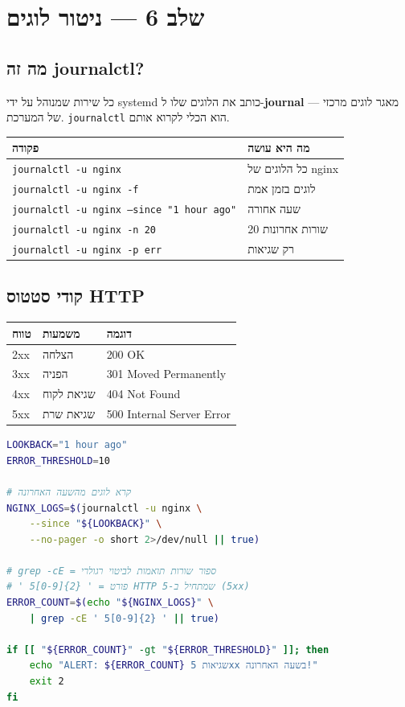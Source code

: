 \documentclass[12pt,a4paper]{article}
\begin{document}
\newpage
\section{שלב 6 — ניטור לוגים}

\subsection{מה זה journalctl?}

כל שירות שמנוהל על ידי systemd כותב את הלוגים שלו ל-\textbf{journal} — מאגר לוגים מרכזי של המערכת. \texttt{journalctl} הוא הכלי לקרוא אותם.

\begin{center}
\begin{tabular}{ll}
\toprule
\textbf{פקודה} & \textbf{מה היא עושה} \\
\midrule
\texttt{journalctl -u nginx} & כל הלוגים של nginx \\
\texttt{journalctl -u nginx -f} & לוגים בזמן אמת \\
\texttt{journalctl -u nginx --since "1 hour ago"} & שעה אחורה \\
\texttt{journalctl -u nginx -n 20} & 20 שורות אחרונות \\
\texttt{journalctl -u nginx -p err} & רק שגיאות \\
\bottomrule
\end{tabular}
\end{center}

\subsection{קודי סטטוס HTTP}

\begin{center}
\begin{tabular}{lll}
\toprule
\textbf{טווח} & \textbf{משמעות} & \textbf{דוגמה} \\
\midrule
2xx & הצלחה & 200 OK \\
3xx & הפניה & 301 Moved Permanently \\
4xx & שגיאת לקוח & 404 Not Found \\
5xx & שגיאת שרת & 500 Internal Server Error \\
\bottomrule
\end{tabular}
\end{center}

\begin{lstlisting}[language=bash, caption={monitor\_logs.sh — ספירת שגיאות 5xx}]
LOOKBACK="1 hour ago"
ERROR_THRESHOLD=10

# קרא לוגים מהשעה האחרונה
NGINX_LOGS=$(journalctl -u nginx \
    --since "${LOOKBACK}" \
    --no-pager -o short 2>/dev/null || true)

# grep -cE = ספור שורות תואמות לביטוי רגולרי
# ' 5[0-9]{2} ' = פורט HTTP שמתחיל ב-5 (5xx)
ERROR_COUNT=$(echo "${NGINX_LOGS}" \
    | grep -cE ' 5[0-9]{2} ' || true)

if [[ "${ERROR_COUNT}" -gt "${ERROR_THRESHOLD}" ]]; then
    echo "ALERT: ${ERROR_COUNT} שגיאות 5xx בשעה האחרונה!"
    exit 2
fi
\end{lstlisting}
\end{document}

